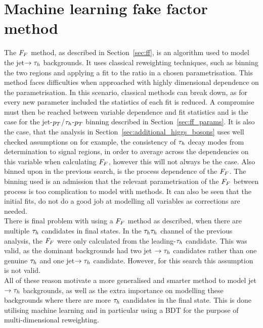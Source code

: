 \section{Machine learning fake factor method}
\label{sec:ml_ff}

The $F_{F}$ method, as described in Section~\ref{sec:ff}, is an algorithm used to model the jet$\rightarrow \tau_{h}$ backgrounds.
It uses classical reweighting techniques, such as binning the two regions and applying a fit to the ratio in a chosen parametrisation.
This method faces difficulties when approached with highly dimensional dependence on the parametrisation.
In this scenario, classical  methods can break down, as for every new parameter included the statistics of each fit is reduced.
A compromise must then be reached between variable dependence and fit statistics and is the case for the jet-$p_{T}$/$\tau_{h}$-$p_{T}$ binning described in Section~\ref{sec:ff_params}.
It is also the case, that the analysis in Section~\ref{sec:additional_higgs_bosons} uses well checked assumptions on for example, the consistency of $\tau_{h}$ decay modes from determination to signal regions, in order to average across the dependencies on this variable when calculating $F_{F}$, however this will not always be the case.
Also binned upon in the previous search, is the process dependence of the $F_{F}$.
The binning used is an admission that the relevant parametrisation of the $F_{F}$ between process is too complication to model with  methods.
It can also be seen that the initial fits, do not do a good job at modelling all variables as corrections are needed. \\

There is final problem with using a $F_{F}$ method as described, when there are multiple $\tau_{h}$ candidates in final states. 
In the $\tau_{h}\tau_{h}$ channel of the previous analysis, the $F_{F}$ were only calculated from the leading-$\tau_{h}$ candidate.
This was valid, as the dominant backgrounds had two jet $\rightarrow\tau_{h}$ candidates rather than one genuine $\tau_{h}$ and one jet$\rightarrow\tau_{h}$ candidate.
However, for this search this assumption is not valid. \\

All of these reason motivate a more generalised and smarter method to model jet $\rightarrow\tau_{h}$ backgrounds, as well as the extra importance on modelling these backgrounds where there are more $\tau_{h}$ candidates in the final state.
This is done utilising machine learning and in particular using a BDT for the purpose of multi-dimensional reweighting. \\ 

